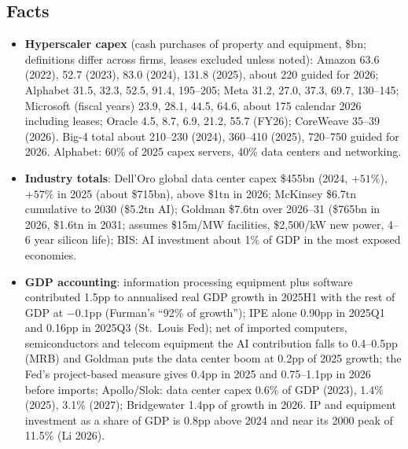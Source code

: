 \documentclass[11pt]{article}
\begin{document}
\subsection{Facts}\label{sec:facts}
\begin{itemize}
  \item \textbf{Hyperscaler capex} (cash purchases of property and equipment, \$bn; definitions differ across firms, leases excluded unless noted): Amazon 63.6 (2022), 52.7 (2023), 83.0 (2024), 131.8 (2025), about 220 guided for 2026; Alphabet 31.5, 32.3, 52.5, 91.4, 195--205; Meta 31.2, 27.0, 37.3, 69.7, 130--145; Microsoft (fiscal years) 23.9, 28.1, 44.5, 64.6, about 175 calendar 2026 including leases; Oracle 4.5, 8.7, 6.9, 21.2, 55.7 (FY26); CoreWeave 35--39 (2026). Big-4 total about 210--230 (2024), 360--410 (2025), 720--750 guided for 2026. Alphabet: 60\% of 2025 capex servers, 40\% data centers and networking.
  \item \textbf{Industry totals}: Dell'Oro global data center capex \$455bn (2024, $+51\%$), $+57\%$ in 2025 (about \$715bn), above \$1tn in 2026; McKinsey \$6.7tn cumulative to 2030 (\$5.2tn AI); Goldman \$7.6tn over 2026--31 (\$765bn in 2026, \$1.6tn in 2031; assumes \$15m/MW facilities, \$2{,}500/kW new power, 4--6 year silicon life); BIS: AI investment about 1\% of GDP in the most exposed economies.
  \item \textbf{GDP accounting}: information processing equipment plus software contributed 1.5pp to annualised real GDP growth in 2025H1 with the rest of GDP at $-0.1$pp (Furman's ``92\% of growth''); IPE alone 0.90pp in 2025Q1 and 0.16pp in 2025Q3 (St.\ Louis Fed); net of imported computers, semiconductors and telecom equipment the AI contribution falls to 0.4--0.5pp (MRB) and Goldman puts the data center boom at 0.2pp of 2025 growth; the Fed's project-based measure gives 0.4pp in 2025 and 0.75--1.1pp in 2026 before imports; Apollo/Slok: data center capex 0.6\% of GDP (2023), 1.4\% (2025), 3.1\% (2027); Bridgewater 1.4pp of growth in 2026. IP and equipment investment as a share of GDP is 0.8pp above 2024 and near its 2000 peak of 11.5\% (Li 2026).
\end{itemize}
\end{document}
